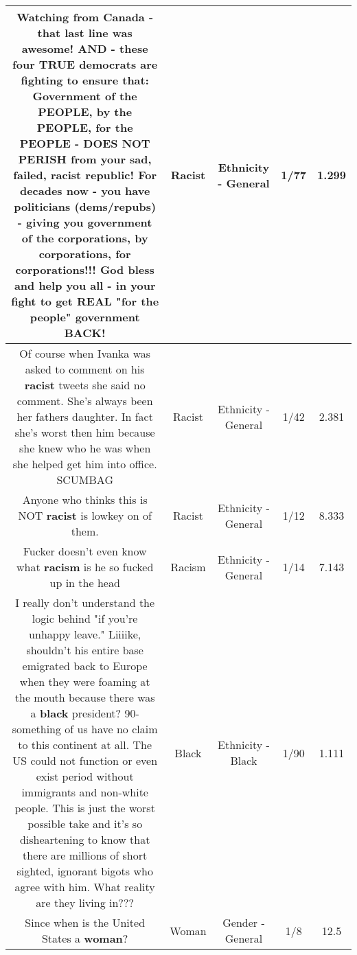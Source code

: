 \documentclass[11pt]{article}
\newlength\mylength
\begin{document}
\begin{center}
\begin{longtable}{|C{.65\mylength}|C{.30\mylength}|C{.12\mylength}|C{.12\mylength}|C{.12\mylength}|}
  \small Watching from Canada - that last line was awesome!   AND - these four TRUE democrats are fighting to ensure that:  Government of the PEOPLE,  by the PEOPLE,  for the PEOPLE  - DOES NOT PERISH  from your sad,  failed,  \textbf{racist} republic!   For decades now  - you have politicians  (dems/repubs)  -  giving you government  of the corporations,  by corporations,  for corporations!!! God bless  and help you all - in your fight to get REAL "for the people"  government BACK!\normalsize   & Racist & Ethnicity - General & 1/77 & 1.299 \\  \hline
  \small Of course when Ivanka was asked to comment on his \textbf{racist} tweets she said no comment. She's always been her fathers daughter. In fact she's worst then him because she knew who he was when she helped get him into office. SCUMBAG\normalsize   & Racist & Ethnicity - General & 1/42 & 2.381 \\  \hline
  \small Anyone who thinks this is NOT \textbf{racist} is lowkey on of them.\normalsize   & Racist & Ethnicity - General & 1/12 & 8.333 \\  \hline
  \small Fucker doesn't even know what \textbf{racism} is he so fucked up in the head\normalsize   & Racism & Ethnicity - General & 1/14 & 7.143 \\  \hline
  \small I really don't understand the logic behind "if you're unhappy leave." Liiiike, shouldn't his entire base emigrated back to Europe when they were foaming at the mouth because there was a \textbf{black} president?  90-something of us have no claim to this continent at all. The US could not function or even exist period without immigrants and non-white people.  This is just the worst possible take and it's so disheartening to know that there are millions of short sighted, ignorant bigots who agree with him. What reality are they living in???\normalsize   & Black & Ethnicity - Black & 1/90 & 1.111 \\  \hline
  \small Since when is the United States a \textbf{woman}?\normalsize   & Woman & Gender - General & 1/8 & 12.5 \\  \hline

\end{longtable}
\end{center}
\end{document}
